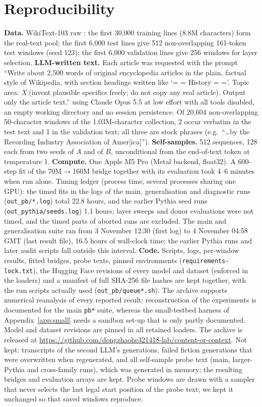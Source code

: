 \section{Reproducibility}
\label{app:repro}
\textbf{Data.} WikiText-103 raw \citep{merity2016wikitext}: the first 30{,}000 training lines (8.8M characters) form the real-text pool; the first 6{,}000 test lines give 512 non-overlapping 161-token test windows (seed 123); the first 6{,}000 validation lines give 256 windows for layer selection. \textbf{LLM-written text.} Each article was requested with the prompt ``Write about 2,500 words of original encyclopedia articles in the plain, factual style of Wikipedia, with section headings written like `= = History = ='. Topic area: \emph{X} (invent plausible specifics freely; do not copy any real article). Output only the article text.'' using Claude Opus 5.5 at low effort with all tools disabled, an empty working directory and no session persistence. Of 20{,}604 non-overlapping 50-character windows of the 1.03M-character collection, 2 occur verbatim in the test text and 1 in the validation text; all three are stock phrases (e.g.\ ``\ldots by the Recording Industry Association of Amer[ica]''). \textbf{Self-samples.} 512 sequences, 128 each from two seeds of $A$ and of $B$, unconditional from the end-of-text token at temperature 1. \textbf{Compute.} One Apple M5 Pro (Metal backend, float32). A 600-step fit of the 70M$\to$160M bridge together with its evaluation took 4--6 minutes when run alone. Timing ledger (process time, several processes sharing one GPU): the timed fits in the logs of the main, generalisation and diagnostic runs (\texttt{out\_pb/*.log}) total 22.8 hours, and the earlier Pythia seed runs (\texttt{out\_pythia/seeds.log}) 1.1 hours; layer sweeps and donor evaluations were not timed, and the timed parts of aborted runs are excluded. The main and generalisation suite ran from 3 November 12:30 (first log) to 4 November 04:58 GMT (last result file), 16.5 hours of wall-clock time; the earlier Pythia runs and later audit scripts fall outside this interval. \textbf{Code.} Scripts, logs, per-window results, fitted bridges, probe texts, pinned environments (\texttt{requirements-lock.txt}), the Hugging Face revisions of every model and dataset (enforced in the loaders) and a manifest of full SHA-256 file hashes are kept together, with the run scripts actually used (\texttt{out\_pb/queue*.sh}). The archive supports numerical reanalysis of every reported result; reconstruction of the experiments is documented for the main \texttt{pb*} suite, whereas the small-testbed harness of Appendix~\ref{app:small} needs a sandbox set-up that is only partly documented. Model and dataset revisions are pinned in all retained loaders. The archive is released at \url{https://github.com/dongzhaohe321418-lab/content-or-context}. Not kept: transcripts of the second LLM's generations, failed fiction generations that were overwritten when regenerated, and all self-sample probe text (main, larger-Pythia and cross-family runs), which was generated in memory; the resulting bridges and evaluation arrays are kept. Probe windows are drawn with a sampler that never selects the last legal start position of the probe text; we kept it unchanged so that saved windows reproduce.
